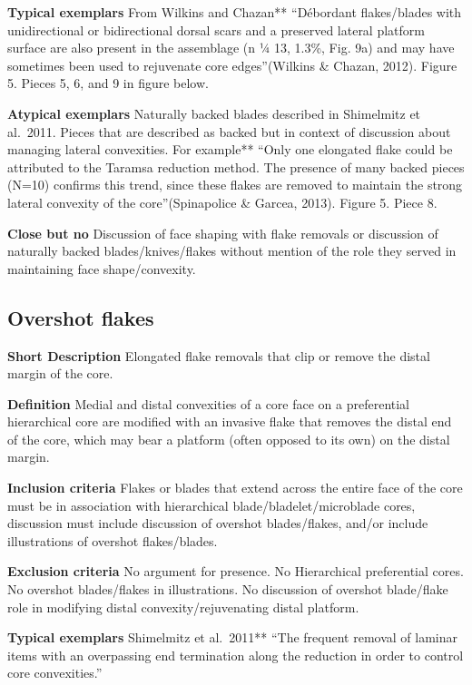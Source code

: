 \documentclass[
]{article}
\begin{document}
\textbf{Typical exemplars} From Wilkins and Chazan** ``Débordant
flakes/blades with unidirectional or bidirectional dorsal scars and a
preserved lateral platform surface are also present in the assemblage (n
¼ 13, 1.3\%, Fig. 9a) and may have sometimes been used to rejuvenate
core edges''(Wilkins \& Chazan, 2012). Figure 5. Pieces 5, 6, and 9 in
figure below.

\textbf{Atypical exemplars} Naturally backed blades described in
Shimelmitz et al.~2011. Pieces that are described as backed but in
context of discussion about managing lateral convexities. For example**
``Only one elongated flake could be attributed to the Taramsa reduction
method. The presence of many backed pieces (N=10) confirms this trend,
since these flakes are removed to maintain the strong lateral convexity
of the core''(Spinapolice \& Garcea, 2013). Figure 5. Piece 8.

\textbf{Close but no} Discussion of face shaping with flake removals or
discussion of naturally backed blades/knives/flakes without mention of
the role they served in maintaining face shape/convexity.

\hypertarget{overshot-flakes}{%
\subsection{Overshot flakes}\label{overshot-flakes}}

\textbf{Short Description} Elongated flake removals that clip or remove
the distal margin of the core.

\textbf{Definition} Medial and distal convexities of a core face on a
preferential hierarchical core are modified with an invasive flake that
removes the distal end of the core, which may bear a platform (often
opposed to its own) on the distal margin.

\textbf{Inclusion criteria} Flakes or blades that extend across the
entire face of the core must be in association with hierarchical
blade/bladelet/microblade cores, discussion must include discussion of
overshot blades/flakes, and/or include illustrations of overshot
flakes/blades.

\textbf{Exclusion criteria} No argument for presence. No Hierarchical
preferential cores. No overshot blades/flakes in illustrations. No
discussion of overshot blade/flake role in modifying distal
convexity/rejuvenating distal platform.

\textbf{Typical exemplars} Shimelmitz et al.~2011** ``The frequent
removal of laminar items with an overpassing end termination along the
reduction in order to control core convexities.''
\end{document}
